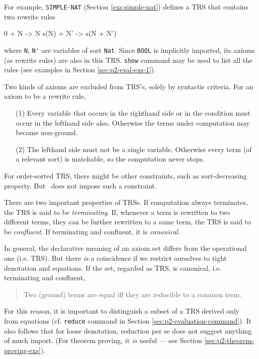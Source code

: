 \documentclass[a4paper]{memoir}
\begin{document}
For example, \verb|SIMPLE-NAT| (Section \ref{exs:simple-nat})
defines a TRS that contains two rewrite rules
\begin{vvtm}
\begin{ccode}
  0 + N -> N
  s(N) + N' -> s(N + N')
\end{ccode}
\end{vvtm}
where \verb|N|, \verb|N'| are variables of sort \verb|Nat|.
Since \verb|BOOL| is implicitly imported, its axioms (as rewrite rules)
are also in this TRS. \verb|show| command may be used to list all
the rules (see examples in Section \ref{sec:p2-eval-exs-1}).

Two kinds of axioms are excluded from TRS's, solely
by syntactic criteria. For an axiom to be a rewrite rule,
\begin{itemize}
\item[(1)] Every variable that occurs in the righthand side or in the
  condition must occur in the lefthand side also. Otherwise the terms
  under computation may become non-ground.
\item[(2)] The lefthand side must not be a single variable. Otherwise
  every term (of a relevant sort) is matchable, so the computation never
  stops.
\end{itemize}
For order-sorted TRS, there might be other constraints, such as
sort-decreasing property. But \cafeobj~does not impose such a constraint.

There are two important properties of TRSs.
If computation always terminates, the TRS is said to be {\em terminating}.
 If, whenever a term is rewritten to two different
terms, they can be further rewritten to a same term, the TRS is said to
be {\em confluent}. If terminating and confluent, it is
{\em canonical}.

In general, the declarative meaning of
an axiom set differs from the operational one (i.e. TRS). But
there {\em is} a coincidence if we restrict ourselves to tight
denotation and equations.
If the set, regarded as TRS, is canonical, i.e. terminating and confluent,
\begin{quote}
Two (ground) terms are equal iff they are reducible to a common term.
\end{quote}
For this reason, it is important to distinguish a subset of
a TRS derived only from equations (cf. \verb|reduce| command in
Section \ref{sec:p2-evaluation-command}). It also follows that
for loose denotation, reduction per se does not suggest anything
of much import. (For theorem proving, it {\em is} useful --- see
Section \ref{sec:p2-theorem-proving-exs}).
\end{document}
